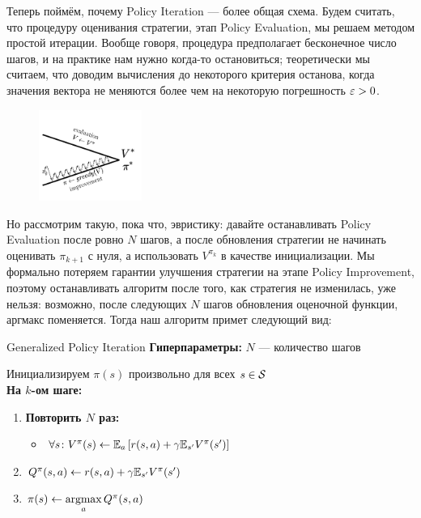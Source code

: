 Теперь поймём, почему Policy Iteration --- более общая схема. Будем считать, что процедуру оценивания стратегии, этап Policy Evaluation, мы решаем методом простой итерации. Вообще говоря, процедура предполагает бесконечное число шагов, и на практике нам нужно когда-то остановиться; теоретически мы считаем, что доводим вычисления до некоторого критерия останова, когда значения вектора не меняются более чем на некоторую погрешность $\varepsilon > 0$. 

\begin{figure}
\vspace{-1.2cm}
\centering
\includegraphics[width=0.3\textwidth]{Images/VI_basic.png}
\vspace{-1cm}
\end{figure}

Но рассмотрим такую, пока что, эвристику: давайте останавливать Policy Evaluation после ровно $N$ шагов, а после обновления стратегии не начинать оценивать $\pi_{k+1}$ с нуля, а использовать $V^{\pi_{k}}$ в качестве инициализации. Мы формально потеряем гарантии улучшения стратегии на этапе Policy Improvement, поэтому останавливать алгоритм после того, как стратегия не изменилась, уже нельзя: возможно, после следующих $N$ шагов обновления оценочной функции, аргмакс поменяется. Тогда наш алгоритм примет следующий вид: 

\begin{algorithm}[label=generalizedpolicyiteration]{Generalized Policy Iteration}
\textbf{Гиперпараметры:} $N$ --- количество шагов

\vspace{0.3cm}
Инициализируем $\pi(s)$ произвольно для всех $s \in \mathcal{S}$ \\
\textbf{На $k$-ом шаге:}
\begin{enumerate}
    \item \textbf{Повторить $N$ раз:}
    \begin{itemize}
        \item $\forall s \colon V^{\pi}(s) \leftarrow \mathbb{E}_{a} \left[ r(s, a) + \gamma \mathbb{E}_{s'} V^{\pi}(s')\right]$
    \end{itemize}
    \item $Q^{\pi}(s, a) \leftarrow r(s, a) + \gamma \mathbb{E}_{s'} V^{\pi}(s')$
    \item $\pi(s) \leftarrow \mathop{\mathrm{argmax}}\limits_a Q^{\pi}(s, a)$
\end{enumerate}
\end{algorithm}

